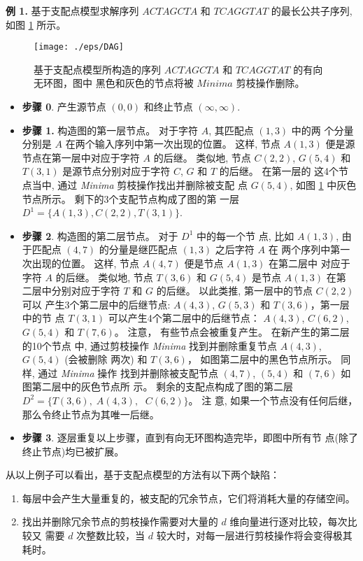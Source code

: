 \documentclass[utf8]{frontiersSCNS} %
\begin{document}
\textbf{例 1.} 基于支配点模型求解序列 $ACTAGCTA$ 和 $TCAGGTAT$ 的最长公共子序列,
如图 \ref{fig:DAG} 所示。

\begin{figure}[!h]
  \centering
  \texttt{[image: ./eps/DAG]}
  \caption{基于支配点模型所构造的序列 $ACTAGCTA$ 和 $TCAGGTAT$ 的有向无环图，图中
    黑色和灰色的节点将被 $Minima$ 剪枝操作删除。}
  \label{fig:DAG}
\end{figure}


\begin{itemize}
\item \textbf{步骤 0}. 产生源节点 $(0,0)$ 和终止节点 $(\infty, \infty)$.
\item \textbf{步骤 1.} 构造图的第一层节点。 对于字符 $A$, 其匹配点 $(1,3)$ 中的两
  个分量分别是 $A$ 在两个输入序列中第一次出现的位置。 这样, 节点 $A(1,3)$ 便是源
  节点在第一层中对应于字符 $A$ 的后继。 类似地, 节点 $C(2,2)$,
  $G(5,4)$ 和 $T(3,1)$ 是源节点分别对应于字符 $C$, $G$ 和 $T$ 的后继。 在第一层的
  这4个节点当中, 通过 \emph{Minima} 剪枝操作找出并删除被支配
  点 $G(5,4)$, 如图 \ref{fig:DAG} 中灰色节点所示。 剩下的3个支配节点构成了图的第
  一层 $D^1=\{A(1,3),C(2,2),T(3,1)\}$.
  
\item \textbf{步骤 2}. 构造图的第二层节点。 对于 $D^1$ 中的每一个节
  点, 比如 $A(1,3)$, 由于匹配点 $(4,7)$ 的分量是继匹配点 $(1,3)$ 之后字符 $A$ 在
  两个序列中第一次出现的位置。 这样, 节点 $A(4,7)$ 便是节点 $A(1, 3)$ 在第二层中
  对应于字符 $A$ 的后继。 类似地, 节点 $T(3,6)$ 和 $G(5,4)$ 是节点 $A(1, 3)$ 在第
  二层中分别对应于字符 $T$ 和 $G$ 的后继。 以此类推, 第一层中的节点 $C(2,2)$ 可以
  产生3个第二层中的后继节点: $A(4,3)$, $G(5,3)$ 和 $T(3,6)$，第一层中的节
  点 $T(3,1)$ 可以产生4个第二层中的后继节点： $A(4,3)$, $C(6,2)$,
  $G(5,4)$ 和 $T(7,6)$。 注意， 有些节点会被重复产生。 在新产生的第二层的10个节点
  中, 通过剪枝操作 \emph{Minima} 找到并删除重复节点 $A(4,3)$, $G(5,4)$ (会被删除
  两次) 和 $T(3,6)$， 如图第二层中的黑色节点所示。 同样, 通过 \emph{Minima} 操作
  找到并删除被支配节点 $(4, 7)$, $(5, 4)$ 和 $(7, 6)$ 如图第二层中的灰色节点所
  示。 剩余的支配点构成了图的第二层 $D^2=\{T(3, 6),\; A(4, 3),\;$ $C(6,2)\}$。 注
  意, 如果一个节点没有任何后继，那么令终止节点为其唯一后继。
\item \textbf{步骤 3}. 逐层重复以上步骤，直到有向无环图构造完毕，即图中所有节
  点(除了终止节点)均已被扩展。
  
\end{itemize}

从以上例子可以看出，基于支配点模型的方法有以下两个缺陷：
\begin{enumerate}
\item 每层中会产生大量重复的，被支配的冗余节点，它们将消耗大量的存储空间。
\item 找出并删除冗余节点的剪枝操作需要对大量的 $d$ 维向量进行逐对比较，每次比较又
  需要 $d$ 次整数比较，当 $d$ 较大时，对每一层进行剪枝操作将会变得极其耗时。
\end{enumerate}
\end{document}
